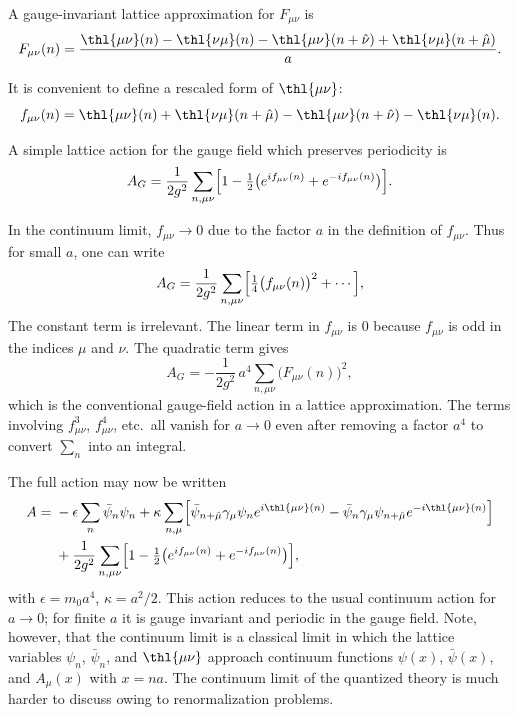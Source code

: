 A gauge-invariant lattice approximation for $F_{\mu\nu}$ is
\begin{equation}
F_{\mu\nu}(n) =
\frac{\thl{\mu\nu}(n)-\thl{\nu\mu}(n)-\thl{\mu\nu}(n+\hat\nu)
+\thl{\nu\mu}(n+\hat\mu)}{a}.
\label{eq:3.7}
\end{equation}

It is convenient to define a rescaled form of $\thl{\mu\nu}$:
\begin{equation}
f_{\mu\nu}(n) = \thl{\mu\nu}(n)+\thl{\nu\mu}(n+\hat\mu)
-\thl{\mu\nu}(n+\hat\nu)-\thl{\nu\mu}(n).
\label{eq:3.8}
\end{equation}

A simple lattice action for the gauge field which preserves periodicity
is
\begin{equation}
A_{G} = \frac{1}{2g^{2}}\sum_{n,\mu\nu}
        \Bigl[1-\tfrac{1}{2}\bigl(e^{if_{\mu\nu}(n)}+e^{-if_{\mu\nu}(n)}\bigr)\Bigr].
\label{eq:3.9}
\end{equation}

In the continuum limit, $f_{\mu\nu} \to 0$ due to the factor $a$ in the
definition of $f_{\mu\nu}$.  Thus for small $a$, one can write
\[
A_{G} = \frac{1}{2g^{2}}\sum_{n,\mu\nu}
        \Bigl[\tfrac{1}{4}\bigl(f_{\mu\nu}(n)\bigr)^{2}+\cdots\Bigr],
\]
The constant term is irrelevant.  The linear term in $f_{\mu\nu}$ is 0
because $f_{\mu\nu}$ is odd in the indices $\mu$ and $\nu$.  The
quadratic term gives
\begin{equation}
A_{G} = -\frac{1}{2g^{2}}\,a^{4}\sum_{n,\mu\nu}\bigl(F_{\mu\nu}(n)\bigr)^{2},
\label{eq:3.11}
\end{equation}
which is the conventional gauge-field action in a lattice approximation.
The terms involving $f_{\mu\nu}^{3}$, $f_{\mu\nu}^{4}$, etc.\ all vanish
for $a\to0$ even after removing a factor $a^{4}$ to convert
$\sum_{n}$ into an integral.

The full action may now be written
\begin{equation}
\begin{split}
A = {} & -\epsilon\sum_{n}\bar\psi_{n}\psi_{n}
         + \kappa\sum_{n,\mu}\Bigl[
           \bar\psi_{n+\hat\mu}\gamma_{\mu}\psi_{n}e^{i\thl{\mu\nu}(n)}
           -\bar\psi_{n}\gamma_{\mu}\psi_{n+\hat\mu}e^{-i\thl{\mu\nu}(n)}\Bigr]\\
       & + \frac{1}{2g^{2}}\sum_{n,\mu\nu}
         \Bigl[1-\tfrac{1}{2}\bigl(e^{if_{\mu\nu}(n)}+e^{-if_{\mu\nu}(n)}\bigr)\Bigr],
\end{split}
\label{eq:3.12}
\end{equation}
with $\epsilon = m_{0}a^{4}$, $\kappa = a^{2}/2$.  This action reduces
to the usual continuum action for $a \to 0$; for finite $a$ it is gauge
invariant and periodic in the gauge field.  Note, however, that the
continuum limit is a classical limit in which the lattice variables
$\psi_{n}$, $\bar\psi_{n}$, and $\thl{\mu\nu}$ approach continuum
functions $\psi(x)$, $\bar\psi(x)$, and $A_{\mu}(x)$ with $x=na$.  The
continuum limit of the quantized theory is much harder to discuss owing
to renormalization problems.

